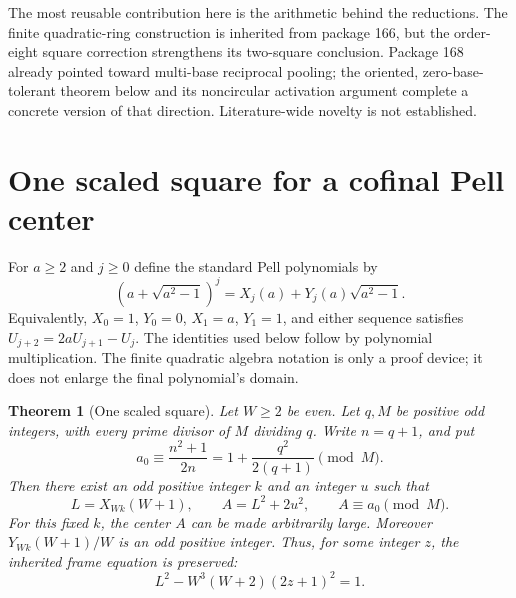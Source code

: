 \documentclass[10pt,letterpaper]{article}
\newtheorem{theorem}{Theorem}[section]
\theoremstyle{definition}\newtheorem{definition}[theorem]{Definition}
\theoremstyle{remark}\newtheorem{remark}[theorem]{Remark}
\begin{document}
The most reusable contribution here is the arithmetic behind the
reductions. The finite quadratic-ring construction is inherited from
package 166, but the order-eight square correction strengthens its
two-square conclusion. Package 168 already pointed toward multi-base
reciprocal pooling; the oriented, zero-base-tolerant theorem below and
its noncircular activation argument complete a concrete version of that
direction. Literature-wide novelty is not established.

\section{One scaled square for a cofinal Pell center}

For $a\ge2$ and $j\ge0$ define the standard Pell polynomials by
\[
 (a+\sqrt{a^2-1})^j=X_j(a)+Y_j(a)\sqrt{a^2-1}.
\]
Equivalently, $X_0=1$, $Y_0=0$, $X_1=a$, $Y_1=1$, and either sequence
satisfies $U_{j+2}=2aU_{j+1}-U_j$. The identities used below follow by
polynomial multiplication. The finite quadratic algebra notation is
only a proof device; it does not enlarge the final polynomial's domain.

\begin{theorem}[One scaled square]\label{thm:center}
Let $W\ge2$ be even. Let $q,M$ be positive odd integers, with every
prime divisor of $M$ dividing $q$. Write $n=q+1$, and put
\[
 a_0\equiv\frac{n^2+1}{2n}
       =1+\frac{q^2}{2(q+1)}\pmod M.
\]
Then there exist an odd positive integer $k$ and an integer $u$ such that
\begin{equation}\label{eq:onecenter}
 L=X_{Wk}(W+1),\qquad A=L^2+2u^2,\qquad A\equiv a_0\pmod M.
\end{equation}
For this fixed $k$, the center $A$ can be made arbitrarily large.
Moreover $Y_{Wk}(W+1)/W$ is an odd positive integer. Thus, for some
integer $z$, the inherited frame equation is preserved:
\begin{equation}\label{eq:oddframe}
 L^2-W^3(W+2)(2z+1)^2=1.
\end{equation}
\end{theorem}
\end{document}
